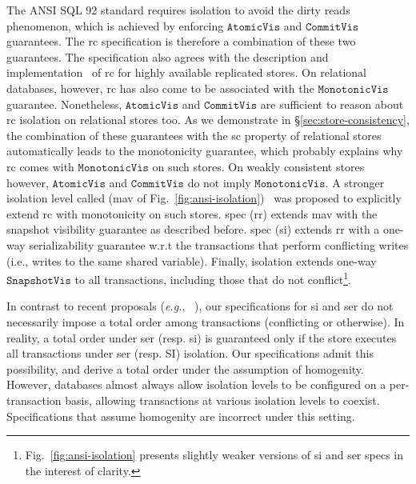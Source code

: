 The ANSI SQL 92 standard requires  isolation to avoid
the dirty reads phenomenon, which is achieved by enforcing
$\mathtt{AtomicVis}$ and $\mathtt{CommitVis}$ guarantees. The {\sc rc}
specification is therefore a combination of these two guarantees. The
specification also agrees with the description and
implementation~\cite{bailishat,pldi15} of {\sc rc} for highly available
replicated stores. On relational databases, however, {\sc rc} has also come
to be associated with the $\mathtt{MonotonicVis}$ guarantee.
Nonetheless, $\mathtt{AtomicVis}$ and $\mathtt{CommitVis}$ are
sufficient to reason about {\sc rc} isolation on relational stores too. As
we demonstrate in \S\ref{sec:store-consistency}, the combination of
these guarantees with the {\sc sc} property of relational stores
automatically leads to the monotonicity guarantee, which probably
explains why {\sc rc} comes with $\mathtt{MonotonicVis}$ on such stores. On
weakly consistent stores however, $\mathtt{AtomicVis}$ and
$\mathtt{CommitVis}$ do not imply $\mathtt{MonotonicVis}$. A stronger
isolation level called  ({\sc mav} of
Fig.~\ref{fig:ansi-isolation})~\cite{bailishat,pldi15} was proposed to
explicitly extend {\sc rc} with monotonicity on such stores.  spec ({\sc rr}) extends {\sc mav} with the snapshot visibility guarantee
as described before.  spec ({\sc si}) extends
{\sc rr} with a one-way serializability guarantee w.r.t the transactions
that perform conflicting writes (i.e., writes to the same shared
variable). Finally,  isolation extends one-way
$\mathtt{SnapshotVis}$ to all transactions, including those that do
not conflict\footnote{Fig.~\ref{fig:ansi-isolation} presents slightly
weaker versions of {\sc si} and {\sc ser} specs in the interest of
clarity.}. 

In contrast to recent proposals (\emph{e.g.},
~\cite{gotsmanconcur15}), our specifications for {\sc si} and {\sc
  ser} do not necessarily impose a total order among transactions
(conflicting or otherwise). In reality, a total order under {\sc ser}
(resp. {\sc si}) is guaranteed only if the store executes all
transactions under {\sc ser} (resp. {\sc SI}) isolation. Our
specifications admit this possibility, and derive a total order under
the assumption of homogenity. However, databases almost always allow
isolation levels to be configured on a per-transaction basis, allowing
transactions at various isolation levels to coexist.  Specifications
that assume homogenity are incorrect under this setting.

